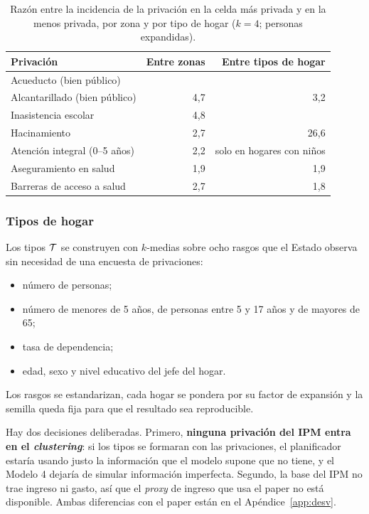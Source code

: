 \begin{table}[ht]
\centering\footnotesize
\caption{Razón entre la incidencia de la privación en la celda más privada y en
la menos privada, por zona y por tipo de hogar ($k=4$; personas expandidas).}
\label{tab:discrimina}
\begin{tabular}{@{}lrr@{}}
\toprule
Privación & Entre zonas & Entre tipos de hogar \\
\midrule
Acueducto (bien público)        & \cDiscAcuZona{} & \cDiscAcuClu{} \\
Alcantarillado (bien público)   & 4,7  & 3,2 \\
Inasistencia escolar            & 4,8  & \cDiscInasClu{} \\
Hacinamiento                    & 2,7  & 26,6 \\
Atención integral (0--5 años)   & 2,2  & solo en hogares con niños \\
Aseguramiento en salud          & 1,9  & 1,9 \\
Barreras de acceso a salud      & 2,7  & 1,8 \\
\bottomrule
\end{tabular}
\end{table}

\subsubsection{Tipos de hogar}

Los tipos $\mathcal{T}$ se construyen con $k$-medias sobre ocho rasgos que el Estado
observa sin necesidad de una encuesta de privaciones:
\begin{itemize}
\item número de personas;
\item número de menores de 5 años, de personas entre 5 y 17 años y de mayores de 65;
\item tasa de dependencia;
\item edad, sexo y nivel educativo del jefe del hogar.
\end{itemize}
Los rasgos se estandarizan, cada hogar se pondera por su factor de expansión y la
semilla queda fija para que el resultado sea reproducible.

Hay dos decisiones deliberadas. Primero, \textbf{ninguna privación del IPM entra
en el \emph{clustering}}: si los tipos se formaran con las privaciones, el
planificador estaría usando justo la información que el modelo supone que no
tiene, y el Modelo 4 dejaría de simular información imperfecta. Segundo, la base
del IPM no trae ingreso ni gasto, así que el \emph{proxy} de ingreso que usa el
paper no está disponible. Ambas diferencias con el paper están en el
Apéndice~\ref{app:desv}.

